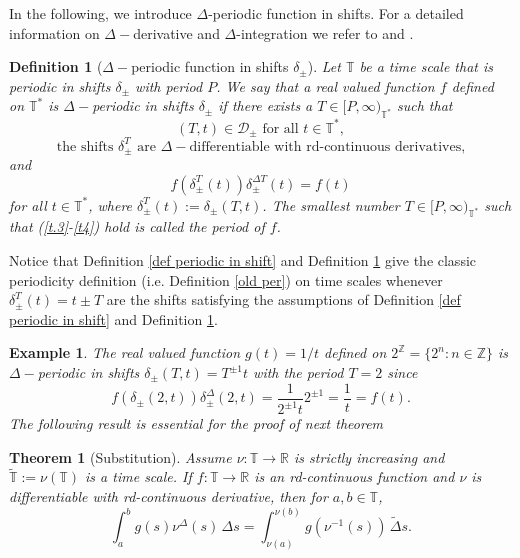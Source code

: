\documentclass[b5paper,reqno]{amsart}\usepackage{amsfonts}
\newtheorem{theorem}{Theorem}
\theoremstyle{plain}
\newtheorem{definition}{Definition}
\newtheorem{example}{Example}
\numberwithin{equation}{section}
\begin{document}
In the following, we introduce $\Delta$-periodic function in shifts. For a
detailed information on $\Delta-$derivative and $\Delta$-integration we refer
to \cite{book} and \cite{book2}.

\begin{definition}
[$\Delta-$periodic function in shifts $\delta_{\pm}$]\label{def delta periodic in shifts}Let $\mathbb{T}$ be a time scale that is
periodic in shifts $\delta_{\pm}$ with period $P$. We say that a real valued
function $f$ defined on $\mathbb{T}^{\ast}$ is\emph{ }$\Delta-$\emph{periodic
in shifts }$\delta_{\pm}$ if there exists a $T\in\lbrack P,\infty
)_{\mathbb{T}^{\ast}}$ such that
\begin{equation}
\left(  T,t\right)  \in\mathcal{D}_{\pm}\text{ for all }t\in\mathbb{T}^{\ast},
\label{t.3}\end{equation}\begin{equation}
\text{the shifts }\delta_{\pm}^{T}\text{ are }\Delta-\text{differentiable with
rd-continuous derivatives,} \label{t3.1}\end{equation}
and\begin{equation}
f(\delta_{\pm}^{T}\left(  t\right)  )\delta_{\pm}^{\Delta T}(t)=f(t)
\label{t4}\end{equation}
for all $t\in\mathbb{T}^{\ast}$, where $\delta_{\pm}^{T}(t):=\delta_{\pm
}(T,t)$. The smallest number $T\in\lbrack P,\infty)_{\mathbb{T}^{\ast}}$ such
that (\ref{t.3}-\ref{t4}) hold is called the period of $f$.
\end{definition}

Notice that Definition \ref{def periodic in shift} and Definition
\ref{def delta periodic in shifts} give the classic periodicity definition
(i.e. Definition \ref{old per}) on time scales whenever $\delta_{\pm}^{T}(t)=t\pm T$ are the shifts satisfying the assumptions of Definition
\ref{def periodic in shift} and Definition \ref{def delta periodic in shifts}.

\begin{example}
The real valued function $g(t)=1/t$ defined on $2^{\mathbb{Z}}=\{2^{n}:n\in\mathbb{Z}\}$ is $\Delta-$\emph{periodic in shifts} $\delta_{\pm
}(T,t)=T^{\pm1}t$ with the period $T=2$ since\[
f\left(  \delta_{\pm}(2,t)\right)  \delta_{\pm}^{\Delta}(2,t)=\frac{1}{2^{\pm1}t}2^{\pm1}=\frac{1}{t}=f(t).
\]
The following result is essential for the proof of next theorem
\end{example}

\begin{theorem}
[Substitution]\label{thm2.2} \cite[Theorem 1.98]{book} Assume $\nu
:\mathbb{T}\rightarrow\mathbb{R}$ is strictly increasing and $\tilde
{\mathbb{T}}:=\nu(\mathbb{T})$ is a time scale. If $f:\mathbb{T}\rightarrow\mathbb{R}$ is an rd-continuous function and $\nu$ is
differentiable with rd-continuous derivative, then for $a,b\in\mathbb{T}$,
\begin{equation}
\int_{a}^{b}\!g(s)\nu^{\Delta}(s)\,\Delta s=\int_{\nu(a)}^{\nu(b)}g(\nu
^{-1}(s))\,\tilde{\Delta}s. \label{substitute}\end{equation}

\end{theorem}
\end{document}
